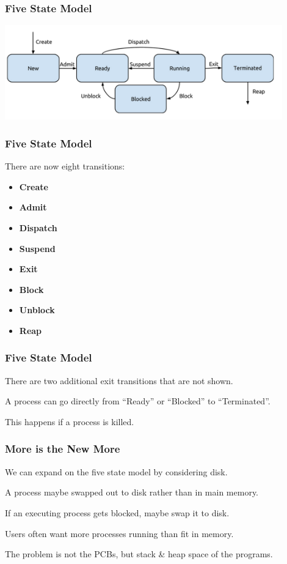 \begin{frame}
\frametitle{Five State Model}

\begin{center}
\includegraphics[width=0.9\textwidth]{images/5-state-model.png}
\end{center}

\end{frame}

\begin{frame}
\frametitle{Five State Model}

There are now eight transitions:

\begin{itemize}
	\item \textbf{Create}
	\item \textbf{Admit}
	\item \textbf{Dispatch}
	\item \textbf{Suspend}
	\item \textbf{Exit}
	\item \textbf{Block}
	\item \textbf{Unblock}
	\item \textbf{Reap}
\end{itemize}

\end{frame}

\begin{frame}
\frametitle{Five State Model}

There are two additional exit transitions that are not shown.

A process can go directly from ``Ready'' or ``Blocked'' to ``Terminated''.

This happens if a process is killed.

\end{frame}

\begin{frame}
\frametitle{More is the New More}

We can expand on the five state model by considering disk.

A process maybe swapped out to disk rather than in main memory.

If an executing process gets blocked, maybe swap it to disk.

Users often want more processes running than fit in memory.

The problem is not the PCBs, but stack \& heap space of the programs.

\end{frame}

